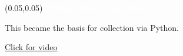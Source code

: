 \documentclass[aspectratio=169]{beamer} %
\begin{document}
\begin{frame}{}
    \setlength{\TPHorizModule}{\textwidth}
    \setlength{\TPVertModule}{\textwidth}
    \begin{textblock}{0.74} (0.05,0.05)
        \bfseries\large\textcolor{white}{Python Data Collection}
    \end{textblock}
    This became the basis for collection via Python.

    \href{https://youtu.be/aTE8uZVO248}{Click for video} %
\end{frame}
\end{document}
